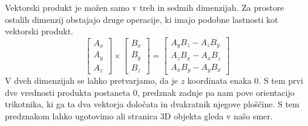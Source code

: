 \documentclass[a4paper, 12px]{article}
\begin{document}
    Vektorski produkt je možen samo v treh in sedmih dimenzijah. Za prostore ostalih dimenzij obstajajo
    druge operacije, ki imajo podobne lastnosti kot vektorski produkt.
    $$\begin{bmatrix}
        A_x \\ A_y \\ A_z
    \end{bmatrix} \times \begin{bmatrix}
        B_x \\ B_y \\ B_z
    \end{bmatrix} = \begin{bmatrix}
        A_y B_z - A_z B_y \\ A_z B_x - A_x B_z \\ A_x B_y - A_y B_x
    \end{bmatrix}$$
    V dveh dimenzijah se lahko pretvarjamo, da je $z$ koordinata enaka $0$. S tem prvi dve vrednosti
    produkta postaneta $0$, predznak zadnje pa nam pove orientacijo trikotnika, ki ga ta dva vektorja 
    določata in dvakratnik njegove ploščine. S tem predznakom lahko ugotovimo ali stranica 3D objekta gleda v našo smer.
    \cite{CrossProdWiki}
\end{document}
